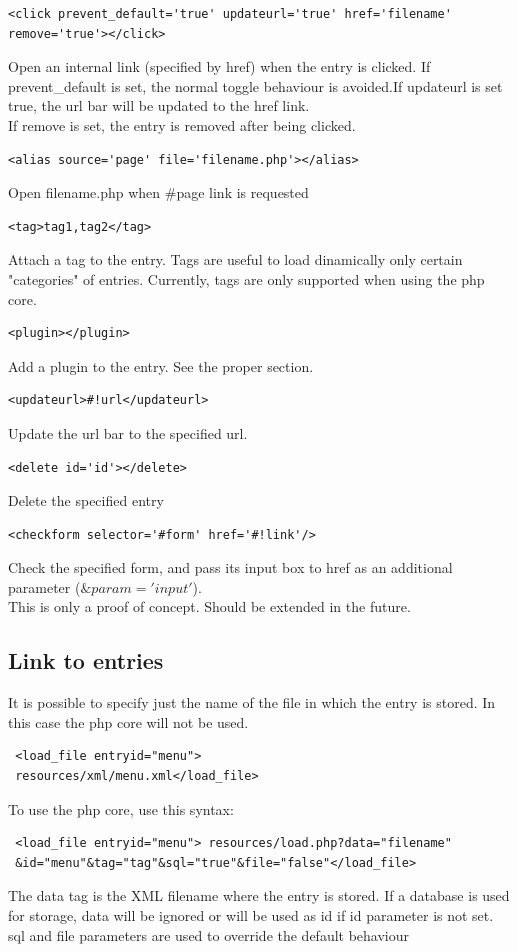 \documentclass[a4paper,12pt]{article}
\begin{document}
\begin{list}{-}{}
\item \begin{verbatim}
<click prevent_default='true' updateurl='true' href='filename' remove='true'></click>
\end{verbatim}
Open an internal link (specified by href) when the entry is clicked. If prevent\_default is set, the normal toggle behaviour is avoided.If updateurl is set true, the url bar will be updated to the href link.\\
If remove is set, the entry is removed after being clicked.
\item \begin{verbatim}
<alias source='page' file='filename.php'></alias>
\end{verbatim}
Open filename.php when \#page link is requested
\item \begin{verbatim}
<tag>tag1,tag2</tag>
\end{verbatim}
Attach a tag to the entry. Tags are useful to load dinamically only certain "categories" of entries. Currently, tags are only supported when using the php core.
\item \begin{verbatim}
<plugin></plugin>
\end{verbatim}
Add a plugin to the entry. See the proper section.
\item \begin{verbatim}
<updateurl>#!url</updateurl>
\end{verbatim}
Update the url bar to the specified url.
\item \begin{verbatim}
<delete id='id'></delete>
\end{verbatim}
Delete the specified entry
\item \begin{verbatim}
<checkform selector='#form' href='#!link'/>
\end{verbatim}
Check the specified form, and pass its input box to href as an additional parameter ($\&param='input'$).\\
This is only a proof of concept. Should be extended in the future.
\end{list}
\normalsize
\subsection{Link to entries}
It is possible to specify just the name of the file in which the entry is stored. In this case the php core will not be used. 
\begin{verbatim}
 <load_file entryid="menu">
 resources/xml/menu.xml</load_file>
\end{verbatim}
To use the php core, use this syntax:
\begin{verbatim}
 <load_file entryid="menu"> resources/load.php?data="filename"
 &id="menu"&tag="tag"&sql="true"&file="false"</load_file>
\end{verbatim}
The data tag is the XML filename where the entry is stored. If a database is used for storage, data will be ignored or will be used as id if id parameter is not set.\\
sql and file parameters are used to override the default behaviour
\end{document}
